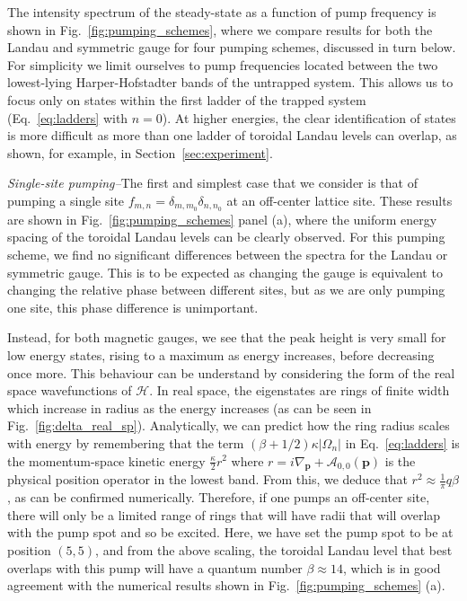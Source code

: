 The intensity spectrum of the steady-state as a function of pump
frequency is shown in Fig.~\ref{fig:pumping_schemes}, where we compare
results for both the Landau and symmetric gauge for four pumping
schemes, discussed in turn below. For simplicity we limit ourselves to
pump frequencies located between the two lowest-lying
Harper-Hofstadter bands of the untrapped system. This allows us to
focus only on states within the first ladder of the trapped system
(Eq.~\eqref{eq:ladders} with $n = 0$). At higher energies, the clear
identification of states is more difficult as more than one ladder of
toroidal Landau levels can overlap, as shown, for example, in
Section~\ref{sec:experiment}.

{\em{Single-site pumping--}}The first and simplest case that we
consider is that of pumping a single site $f_{m,n} = \delta_{m,m_0}
\delta_{n,n_0}$ at an off-center lattice site. These results are shown
in Fig.~\ref{fig:pumping_schemes} panel (a), where the uniform energy
spacing of the toroidal Landau levels can be clearly observed. For
this pumping scheme, we find no significant differences between the
spectra for the Landau or symmetric gauge. This is to be expected as
changing the gauge is equivalent to changing the relative phase
between different sites, but as we are only pumping one site, this
phase difference is unimportant.

Instead, for both magnetic gauges, we see that the peak height is very
small for low energy states, rising to a maximum as energy increases,
before decreasing once more. This behaviour can be understand by
considering the form of the real space wavefunctions of $\mathcal{H}$.
In real space, the eigenstates are rings of finite width which
increase in radius as the energy increases (as can be seen in
Fig.~\ref{fig:delta_real_sp}). Analytically, we can predict how the
ring radius scales with energy by remembering that the term
$(\beta + 1/2) \kappa |\Omega_n|$ in Eq.~\eqref{eq:ladders} is the
momentum-space kinetic energy $\frac{\kappa}{2}r^2$ where
$r = i\nabla_{\mathbf{p}} + \mathcal{A}_{0, 0}(\mathbf{p})$ is the
physical position operator in the lowest band. From this, we deduce
that $r^2 \approx \frac{1}{\pi} q \beta$, as can be confirmed
numerically. Therefore, if one pumps an off-center site, there will
only be a limited range of rings that will have radii that will
overlap with the pump spot and so be excited. Here, we have set the
pump spot to be at position $(5,5)$, and from the above scaling, the
toroidal Landau level that best overlaps with this pump will have a
quantum number $\beta \approx 14$, which is in good agreement with the
numerical results shown in Fig.~\ref{fig:pumping_schemes} (a).

